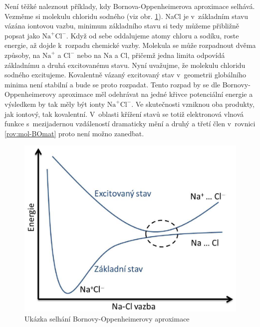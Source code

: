 Není těžké naleznout příklady, kdy Bornova-Oppenheimerova aproximace selhává. Vezměme si molekulu chloridu sodného (viz obr. \ref{obr:mol:NaCl disociace}). NaCl je v~základním stavu vázána iontovou vazbu, minimum základního stavu si tedy můžeme přibližně popsat jako $\mathrm{Na}^{+}\mathrm{Cl}^{-}$. Když od sebe oddalujeme atomy chloru a sodíku, roste energie, až dojde k~rozpadu chemické vazby. Molekula se může rozpadnout dvěma způsoby, na $\mathrm{Na}^{+}$ a $\mathrm{Cl}^{-}$ nebo na $\mathrm{Na}$ a $\mathrm{Cl}$, přičemž jedna limita odpovídá základnímu a druhá excitovanému stavu. Nyní uvažujme, že molekulu chloridu sodného excitujeme. Kovalentně vázaný excitovaný stav v~geometrii globálního minima není stabilní a bude se proto rozpadat. Tento rozpad by se dle Bornovy-Oppenheimerovy aproximace měl odehrávat na jedné křivce potenciální energie a výsledkem by tak měly být ionty $\mathrm{Na}^{+}\mathrm{Cl}^{-}$. Ve skutečnosti vzniknou oba produkty, jak iontový, tak kovalentní. V~oblasti křížení stavů se totiž elektronová vlnová funkce s~mezijadernou vzdáleností dramaticky mění a druhý a třetí člen v~rovnici \ref{rov:mol-BOmat} proto není možno zanedbat. 


\begin{figure} [ht]
\centering
\includegraphics[scale=0.5]{obrazky/NaCl_disociace.eps}
\caption[NaCl disociace]{Ukázka selhání Bornovy-Oppenheimerovy aproximace}
\label{obr:mol:NaCl disociace}
\end{figure}


 
